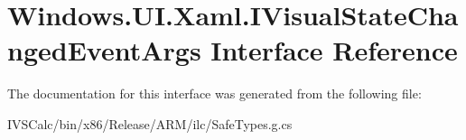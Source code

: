 \hypertarget{interface_windows_1_1_u_i_1_1_xaml_1_1_i_visual_state_changed_event_args}{}\section{Windows.\+U\+I.\+Xaml.\+I\+Visual\+State\+Changed\+Event\+Args Interface Reference}
\label{interface_windows_1_1_u_i_1_1_xaml_1_1_i_visual_state_changed_event_args}


The documentation for this interface was generated from the following file\+:\begin{DoxyCompactItemize}
\item 
I\+V\+S\+Calc/bin/x86/\+Release/\+A\+R\+M/ilc/Safe\+Types.\+g.\+cs\end{DoxyCompactItemize}
